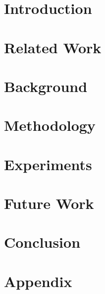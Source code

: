\documentclass[fleqn]{article}
\begin{document}
\begin{multicols}{2}
\section{Introduction}



\section{Related Work}



\section{Background}



\section{Methodology}



\section{Experiments}



\section{Future Work}



\section{Conclusion}


%
%



\end{multicols}
\pagebreak

\section{Appendix}


\end{document}
